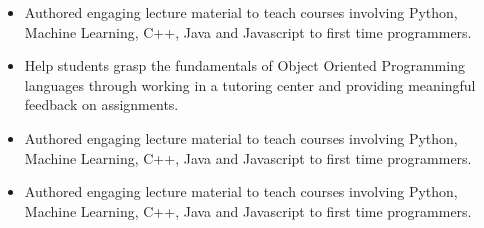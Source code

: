 \documentclass[10pt,a4paper,ragged2e]{altacv}
\begin{document}
\vspace{10px}

\begin{itemize}
    \item Authored engaging lecture material to teach courses involving Python, Machine Learning, C++, Java and Javascript to first time programmers. 
\end{itemize}

\vspace{10px}

\begin{itemize}
    \item Help students grasp the fundamentals of Object Oriented Programming languages through working in a tutoring center and providing meaningful feedback on assignments.
\end{itemize}


\begin{itemize}
  \item Authored engaging lecture material to teach courses involving Python, Machine Learning, C++, Java and Javascript to first time programmers. 
\end{itemize}

\vspace{10px}

\begin{itemize}
  \item Authored engaging lecture material to teach courses involving Python, Machine Learning, C++, Java and Javascript to first time programmers. 
\end{itemize}
\end{document}
